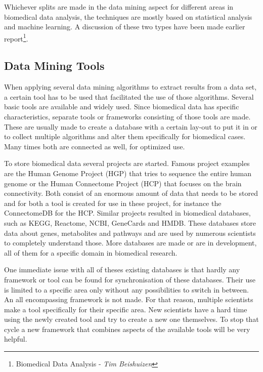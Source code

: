 \documentclass[10pt,a4paper]{article}
\begin{document}
	Whichever splits are made in the data mining aspect for different areas in biomedical data analysis, the techniques are mostly based on statistical analysis and machine learning. A discussion of these two types have been made earlier report\footnote{\label{fn:BDA}Biomedical Data Analysis - \textit{Tim Beishuizen}}.
	
	\subsection{Data Mining Tools}
	\label{subsec:DataMiningTools}
	
	When applying several data mining algorithms to extract results from a data set, a certain tool has to be used that facilitated the use of those algorithms. Several basic tools are available and widely used. Since biomedical data has specific characteristics, separate tools or frameworks consisting of those tools are made. These are usually made to create a database with a certain lay-out to put it in or to collect multiple algorithms and alter them specifically for biomedical cases. Many times both are connected as well, for optimized use.
	
	To store biomedical data several projects are started. Famous project examples are the Human Genome Project (HGP) that tries to sequence the entire human genome\cite{sawicki1993human} or the Human Connectome Project (HCP) that focuses on the brain connectivity\cite{van2012human}. Both consist of an enormous amount of data that needs to be stored and for both a tool is created for use in these project, for instance the ConnectomeDB for the HCP\cite{marcus2011informatics}. Similar projects resulted in biomedical databases, such as KEGG\cite{kanehisa2000kegg}, Reactome\cite{joshi2005reactome}, NCBI\cite{edgar2002gene}, GeneCards\cite{safran2010genecards} and HMDB\cite{wishart2007hmdb}. These databases store data about genes, metabolites and pathways and are used by numerous scientists to completely understand those. More databases are made or are in development, all of them for a specific domain in biomedical research.
	
	One immediate issue with all of theses existing databases is that hardly any framework or tool can be found for synchronisation of these databases. Their use is limited to a specific area only without any possibilities to switch in between. An all encompassing framework is not made. For that reason, multiple scientists make a tool specifically for their specific area. New scientists have a hard time using the newly created tool and try to create a new one themselves. To stop that cycle a new framework that combines aspects of the available tools will be very helpful\cite{teodoro2009biomedical}.
	
\end{document}
